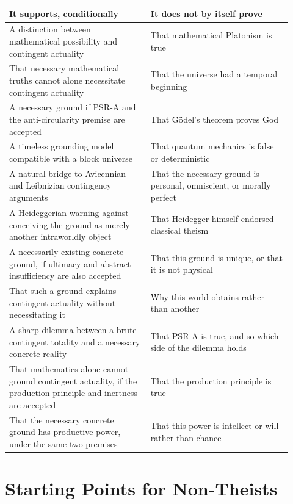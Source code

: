 \documentclass[11pt,letterpaper]{article}
\theoremstyle{plain}
\theoremstyle{definition}
\begin{document}
\begin{center}
\renewcommand{\arraystretch}{1.2}
\begin{tabular}{@{}L{0.46\linewidth}L{0.46\linewidth}@{}}
\toprule
\textbf{It supports, conditionally} & \textbf{It does not by itself prove} \\
\midrule
A distinction between mathematical possibility and contingent actuality & That mathematical Platonism is true \\
That necessary mathematical truths cannot alone necessitate contingent actuality & That the universe had a temporal beginning \\
A necessary ground if PSR-A and the anti-circularity premise are accepted & That Gödel's theorem proves God \\
A timeless grounding model compatible with a block universe & That quantum mechanics is false or deterministic \\
A natural bridge to Avicennian and Leibnizian contingency arguments & That the necessary ground is personal, omniscient, or morally perfect \\
A Heideggerian warning against conceiving the ground as merely another intraworldly object & That Heidegger himself endorsed classical theism \\
A necessarily existing concrete ground, if ultimacy and abstract insufficiency are also accepted & That this ground is unique, or that it is not physical \\
That such a ground explains contingent actuality without necessitating it & Why this world obtains rather than another \\
A sharp dilemma between a brute contingent totality and a necessary concrete reality & That PSR-A is true, and so which side of the dilemma holds \\
That mathematics alone cannot ground contingent actuality, if the production principle and inertness are accepted & That the production principle is true \\
That the necessary concrete ground has productive power, under the same two premises & That this power is intellect or will rather than chance \\
\bottomrule
\end{tabular}
\end{center}

\section{Starting Points for Non-Theists}
\label{sec:nontheist}
\end{document}

